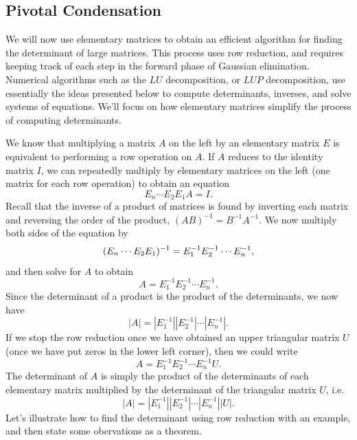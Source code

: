 \subsection{Pivotal Condensation}

We will now use elementary matrices to obtain an efficient algorithm for finding the determinant of large matrices.  This process uses row reduction, and requires keeping track of each step in the forward phase of Gaussian elimination. Numerical algorithms such as the $LU$ decomposition, or $LUP$ decomposition, use essentially the ideas presented below to compute determinants, inverses, and solve systems of equations.  We'll focus on how elementary matrices simplify the process of computing determinants.

We know that multiplying a matrix $A$ on the left by an elementary matrix $E$ is equivalent to performing a row operation on $A$. 
If $A$ reduces to the identity matrix $I$, we can repeatedly multiply by elementary matrices on the left (one matrix for each row operation) to obtain an equation $$E_n \cdots E_2E_1A=I.$$ 
Recall that the inverse of a product of matrices is found by inverting each matrix and reversing the order of the product, $(AB)^{-1} = B^{-1}A^{-1}$. 
We now multiply both sides of the equation by  
$$(E_n \cdots E_2E_1)^{-1} = E_1^{-1}E_2^{-1}\cdots E_n^{-1},$$ 
and then solve for $A$ to obtain 
$$A=E_1^{-1}E_2^{-1}\cdots E_n^{-1}.$$  
Since the determinant of a product is the product of the determinants, we now have 
$$|A|=|E_1^{-1}||E_2^{-1}|\cdots |E_n^{-1}|.$$ 
If we stop the row reduction once we have obtained an upper triangular matrix $U$ (once we have put zeros in the lower left corner), then we could write $$A=E_1^{-1}E_2^{-1}\cdots E_n^{-1}U.$$  The determinant of $A$ is simply the product of the determinants of each elementary matrix multiplied by the determinant of the triangular matrix $U$, i.e. $$|A|=|E_1^{-1}||E_2^{-1}|\cdots |E_n^{-1}| |U|.$$ Let's illustrate how to find the determinant using row reduction with an example, and then state some obervations as a theorem.

